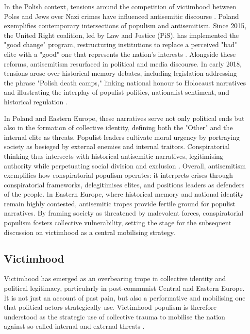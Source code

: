 In the Polish context, tensions around the competition of victimhood between Poles and Jews over Nazi crimes have influenced antisemitic discourse \citep{bergmann_antisemitism_2013}. Poland exemplifies contemporary intersections of populism and antisemitism. Since 2015, the United Right coalition, led by Law and Justice (PiS), has implemented the "good change" program, restructuring institutions to replace a perceived "bad" elite with a "good" one that represents the nation's interests \citep{bill_counter-elite_2022}. Alongside these reforms, antisemitism resurfaced in political and media discourse. In early 2018, tensions arose over historical memory debates, including legislation addressing the phrase "Polish death camps," linking national honour to Holocaust narratives and illustrating the interplay of populist politics, nationalist sentiment, and historical regulation \citep{pankowski_resurgence_2018}.

In Poland and Eastern Europe, these narratives serve not only political ends but also in the formation of collective identity, defining both the "Other" and the internal elite as threats. Populist leaders cultivate moral urgency by portraying society as besieged by external enemies and internal traitors. Conspiratorial thinking thus intersects with historical antisemitic narratives, legitimising authority while perpetuating social division and exclusion \citep{bergmann_strategic_2025}.  Overall, antisemitism exemplifies how conspiratorial populism operates: it interprets crises through conspiratorial frameworks, delegitimises elites, and positions leaders as defenders of the people. In Eastern Europe, where historical memory and national identity remain highly contested, antisemitic tropes provide fertile ground for populist narratives. By framing society as threatened by malevolent forces, conspiratorial populism fosters collective vulnerability, setting the stage for the subsequent discussion on victimhood as a central mobilising strategy.

\subsection{Victimhood}

Victimhood has emerged as an overbearing trope in collective identity and political legitimacy, particularly in post-communist Central and Eastern Europe. It is not just an account of past pain, but also a performative and mobilising one that political actors strategically use. Victimhood populism is therefore understood as the strategic use of collective trauma to mobilise the nation against so-called internal and external threats \citep{meijen_populist_2024}.

